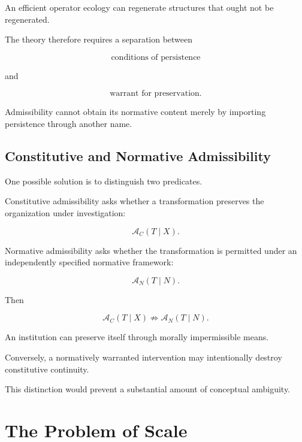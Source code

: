 \documentclass[11pt]{article}
\theoremstyle{remark}
\newcommand{\Adm}{\mathcal{A}}
\begin{document}
An efficient operator ecology can regenerate structures that ought not be regenerated.

The theory therefore requires a separation between

\begin{equation}
\text{conditions of persistence}
\end{equation}

and

\begin{equation}
\text{warrant for preservation}.
\end{equation}

Admissibility cannot obtain its normative content merely by importing persistence through another name.

\subsection{Constitutive and Normative Admissibility}

One possible solution is to distinguish two predicates.

Constitutive admissibility asks whether a transformation preserves the organization under investigation:

\begin{equation}
\Adm_C(T\mid X).
\end{equation}

Normative admissibility asks whether the transformation is permitted under an independently specified normative framework:

\begin{equation}
\Adm_N(T\mid N).
\end{equation}

Then

\begin{equation}
\Adm_C(T\mid X)
\not\Rightarrow
\Adm_N(T\mid N).
\end{equation}

An institution can preserve itself through morally impermissible means.

Conversely, a normatively warranted intervention may intentionally destroy constitutive continuity.

This distinction would prevent a substantial amount of conceptual ambiguity.

\section{The Problem of Scale}
\end{document}
